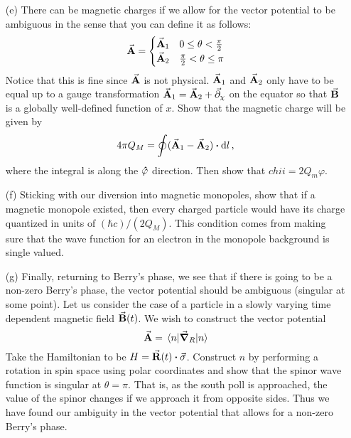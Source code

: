 \documentclass[a4paper,twoside]{article}
\begin{document}
\begin{itemize}
\begin{problem}
        \end{problem}
    \item[(e)] There can be magnetic charges if we allow for the vector potential to be ambiguous in the sense that you can define it as follows:
        \begin{equation}
            \va{A} = \begin{cases} \va{A}_1 & 0 \leq \theta < \frac{\pi}{2} \\ \va{A}_2 & \frac{\pi}{2} < \theta \leq \pi \end{cases}
        \end{equation}
        Notice that this is fine since $ \va{A} $ is not physical. $ \va{A}_1 $ and $ \va{A}_2 $ only have to be equal up to a gauge transformation $ \va{A}_1 = \va{A}_2 + \va{\partial}_{\chi} $ on the equator so that $ \va{B} $ is a globally well-defined function of $ x $. Show that the magnetic charge will be given by
        \begin{equation}
            4 \pi Q_M = \oint (\va{A}_1 - \va{A}_2) \vdot \dd{l},
        \end{equation}
        where the integral is along the $ \vu{\varphi} $ direction. Then show that $ chii = 2Q_m \varphi $.
        \begin{problem}
            
        \end{problem}
    \item[(f)] Sticking with our diversion into magnetic monopoles, show that if a magnetic monopole existed, then every charged particle would have its charge quantized in units of $ (\hbar c)/(2Q_M) $. This condition comes from making sure that the wave function for an electron in the monopole background is single valued.
        \begin{problem}
            
        \end{problem}
    \item[(g)] Finally, returning to Berry's phase, we see that if there is going to be a non-zero Berry's phase, the vector potential should be ambiguous (singular at some point). Let us consider the case of a particle in a slowly varying time dependent magnetic field $ \va{B}(t) $. We wish to construct the vector potential
        \begin{equation}
            \va{A} = \mel{n}{\grad_R}{n}
        \end{equation}
        Take the Hamiltonian to be $ H = \va{R}(t) \vdot \va{\sigma} $. Construct $ n $ by performing a rotation in spin space using polar coordinates and show that the spinor wave function is singular at $ \theta = \pi $. That is, as the south poll is approached, the value of the spinor changes if we approach it from opposite sides. Thus we have found our ambiguity in the vector potential that allows for a non-zero Berry's phase.
\end{itemize}
\end{document}
